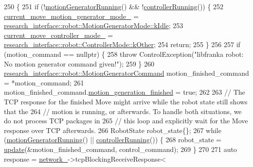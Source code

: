 \begin{DoxyCode}
250                                                                      \{
251   \textcolor{keywordflow}{if} (!\hyperlink{classfranka_1_1Robot_1_1Impl_aa6b34693c27b529a52f7ea5a607c7252}{motionGeneratorRunning}() && !\hyperlink{classfranka_1_1Robot_1_1Impl_ac2d91fb2b9838536bcea8ab1aae4802e}{controllerRunning}()) \{
252     \hyperlink{classfranka_1_1Robot_1_1Impl_a2fecb29212c55738e284b2ba8249ad5c}{current\_move\_motion\_generator\_mode\_} = 
      \hyperlink{namespaceresearch__interface_1_1robot_abd2451eb963a1843f1eb066ebd4b06e8af5137a026a4b2f3b1c8a21cfc60dd14b}{research\_interface::robot::MotionGeneratorMode::kIdle};
253     \hyperlink{classfranka_1_1Robot_1_1Impl_ab5d1a7e855dae2453635da08440c375e}{current\_move\_controller\_mode\_} = 
      \hyperlink{namespaceresearch__interface_1_1robot_a54ee0c8bfefd2ee8a46837ca6d2b1213a341b8a8f03cf33821c46aa5c3aad4b7a}{research\_interface::robot::ControllerMode::kOther};
254     \textcolor{keywordflow}{return};
255   \}
256 
257   \textcolor{keywordflow}{if} (motion\_command == \textcolor{keyword}{nullptr}) \{
258     \textcolor{keywordflow}{throw} ControlException(\textcolor{stringliteral}{"libfranka robot: No motion generator command given!"});
259   \}
260   \hyperlink{structresearch__interface_1_1robot_1_1MotionGeneratorCommand}{research\_interface::robot::MotionGeneratorCommand} 
      motion\_finished\_command = *motion\_command;
261   motion\_finished\_command.\hyperlink{structresearch__interface_1_1robot_1_1MotionGeneratorCommand_af42f06a136505ab2d62ecd70e4cc0db7}{motion\_generation\_finished} = \textcolor{keyword}{true};
262 
263   \textcolor{comment}{// The TCP response for the finished Move might arrive while the robot state still shows that the}
264   \textcolor{comment}{// motion is running, or afterwards. To handle both situations, we do not process TCP packages in}
265   \textcolor{comment}{// this loop and explicitly wait for the Move response over TCP afterwards.}
266   RobotState robot\_state\{\};
267   \textcolor{keywordflow}{while} (\hyperlink{classfranka_1_1Robot_1_1Impl_aa6b34693c27b529a52f7ea5a607c7252}{motionGeneratorRunning}() || \hyperlink{classfranka_1_1Robot_1_1Impl_ac2d91fb2b9838536bcea8ab1aae4802e}{controllerRunning}()) \{
268     robot\_state = \hyperlink{classfranka_1_1Robot_1_1Impl_a961bcad42d2be61ff56b7004498fa8dd}{update}(&motion\_finished\_command, control\_command);
269   \}
270 
271   \textcolor{keyword}{auto} response = \hyperlink{classfranka_1_1Robot_1_1Impl_acecf3b158ccd1c2ed7e76971f1e6a192}{network\_}->tcpBlockingReceiveResponse<

\end{DoxyCode}
